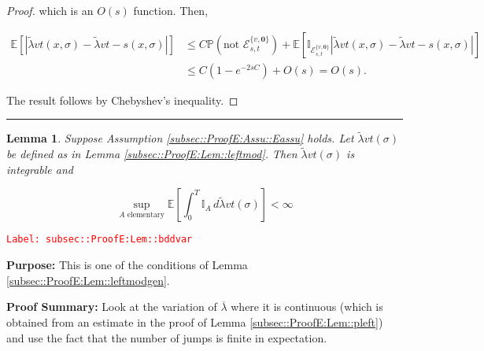 \documentclass[12pt]{article}
\newcommand{\mb}{\mathbb}
\newcommand{\mc}{\mathcal}
\newcommand{\ov}{\overline}
\newcommand{\te}{\text}
\newcommand{\tr}{\textcolor{red}}
\newcommand{\labe}[1]{\tr{\texttt{Label: #1}}}
\newcommand{\purpose}{\textbf{Purpose: }}
\newcommand{\pfsum}{\textbf{Proof Summary: }}
\newcommand{\lin}{\rule{\linewidth}{0.4 pt}}
\newcommand{\pr}{\mb{P}}							%
\newcommand{\ex}[1]{\mb{E}\left[#1\right]}			%
\renewcommand{\root}{\mathbf{0}}				%
\renewcommand{\v}{v}							%
\renewcommand{\S}{S}							%
\newcommand{\s}{\sigma}							%
\newcommand{\T}{T}								%
\newcommand{\x}{x}								%
\renewcommand{\t}{t}							%
\renewcommand{\tt}{s}							%
\newcommand{\const}{C}							%
\newcommand{\alt}[1]{\widetilde{#1}}			%
\newcommand{\evnt}{\mc{E}}						%
\newcommand{\typset}{A}							%
\newcommand{\crate}{\alt{\lambda}}				%
\newtheorem{lem}[thms]{Lemma}
\begin{document}
\begin{proof}
which is an \(O(s)\) function. Then,

\begin{align*}
\ex{|\crate{\v}{\t}(\x{}{},\s) - \crate{\v}{\t-\tt}(\x{}{},\s)|} &\leq \const{}\pr\left(\te{not }\evnt^{\{\v,\root\}}_{\tt,\t}\right) + \ex{\mb{I}_{\evnt^{\{\v,\root\}}_{\tt,\t}}|\crate{\v}{\t}(\x{}{},\s) - \crate{\v}{\t-\tt}(\x{}{},\s)|}\\
&\leq \const{}(1 - e^{-2\tt\const{}}) + O(s) = O(s).
\end{align*}

The result follows by Chebyshev's inequality.
\end{proof}

\lin

\begin{lem}
Suppose Assumption \ref{subsec::ProofE:Assu::Eassu} holds. Let \(\crate{\v}{\t}(\s)\) be defined as in Lemma \ref{subsec::ProofE:Lem::leftmod}. Then \(\crate{\v}{\t}(\s)\) is integrable and 

\[\sup_{\typset\te{ elementary}} \ex{\int_0^\T \mb{I}_\typset\,d\crate{\v}{\t}(\s)} < \infty\]
\label{subsec::ProofE:Lem::bddvar}
\end{lem}
\labe{subsec::ProofE:Lem::bddvar}

\purpose This is one of the conditions of Lemma \ref{subsec::ProofE:Lem::leftmodgen}.

\pfsum Look at the variation of \(\ov{\lambda}\) where it is continuous (which is obtained from an estimate in the proof of Lemma \ref{subsec::ProofE:Lem::pleft}) and use the fact that the number of jumps is finite in expectation.
\end{document}
